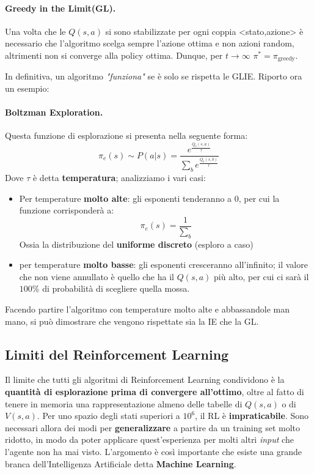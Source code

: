 \paragraph{Greedy in the Limit(GL).}Una volta che le $Q(s,a)$ si sono stabilizzate per ogni coppia <stato,azione>
è necessario che l'algoritmo scelga sempre l'azione ottima e non azioni random, altrimenti non si converge
alla policy ottima. Dunque, per $t \to \infty$ $\pi^* = \pi_\text{greedy}$.

In definitiva, un algoritmo \textit{"funziona"} se è solo se rispetta le GLIE. Riporto ora un esempio:

\paragraph{Boltzman Exploration.}Questa funzione di esplorazione si presenta nella seguente forma:
\begin{equation}
    \pi_e(s) \sim P(a | s) = \frac{e^{\frac{Q_t(s,a)}{\tau}}}{\sum_{b} e^{\frac{Q_t(s,b)}{\tau}}}
\end{equation}
Dove $\tau$ è detta \textbf{temperatura}; analizziamo i vari casi:
\begin{itemize}
    \item Per temperature \textbf{molto alte}: gli esponenti tenderanno a 0, per cui la funzione corrisponderà a:
    \begin{equation}
        \pi_e(s) = \frac{1}{\sum_{b}}
    \end{equation}
    Ossia la distribuzione del \textbf{uniforme discreto} (esploro a caso)
    \item per temperature \textbf{molto basse}: gli esponenti cresceranno all'infinito; il valore che non viene annullato è quello che ha il $Q(s,a)$ più alto, per cui ci sarà il $100\%$ di probabilità di scegliere quella mossa.
\end{itemize}
Facendo partire l'algoritmo con temperature molto alte e abbassandole man mano, si può dimostrare che vengono rispettate sia la IE che la GL.

\subsection{Limiti del Reinforcement Learning}
Il limite che tutti gli algoritmi di Reinforcement Learning condividono è la \textbf{quantità di esplorazione prima di convergere all'ottimo},
oltre al fatto di tenere in memoria una rappresentazione almeno delle tabelle di $Q(s,a)$ o di $V(s,a)$. Per uno spazio degli stati 
superiori a $10^6$, il RL è \textbf{impraticabile}. Sono necessari allora dei modi per \textbf{generalizzare} a partire da un training
set molto ridotto, in modo da poter applicare quest'esperienza per molti altri \textit{input} che l'agente non ha mai visto. L'argomento
è così importante che esiste una grande branca dell'Intelligenza Artificiale detta \textbf{Machine Learning}.

